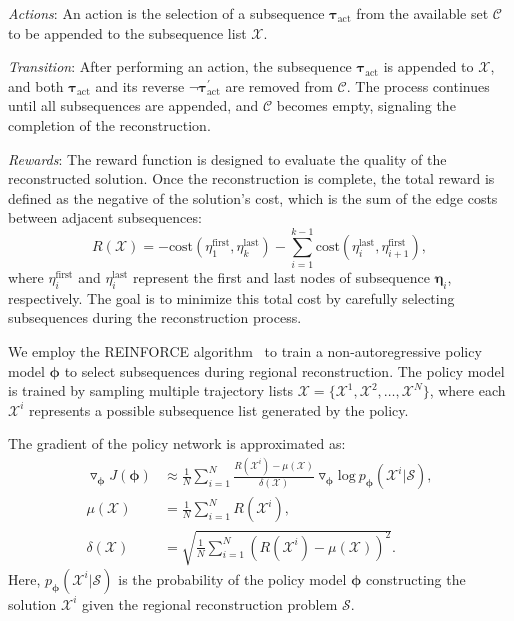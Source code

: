\textit{Actions}: An action is the selection of a subsequence $\boldsymbol{\tau}_{\text{act}}$ from the available set $\mathcal{C}$ to be appended to the subsequence list $\mathcal{X}$.

\textit{Transition}: After performing an action, the subsequence $\boldsymbol{\tau}_{\text{act}}$ is appended to $\mathcal{X}$, and both $\boldsymbol{\tau}_{\text{act}}$ and its reverse $\neg\boldsymbol{\tau}_{\text{act}}^{\prime}$ are removed from $\mathcal{C}$.
The process continues until all subsequences are appended, and  $\mathcal{C}$ becomes empty, signaling the completion of the reconstruction. 

\textit{Rewards}: The reward function is designed to evaluate the quality of the reconstructed solution. 
Once the reconstruction is complete, the total reward is defined as  the negative of the solution's cost, which is the sum of the edge costs between adjacent subsequences: 
\begin{equation}
{R(\mathcal{X})=-\text{cost}(\eta_{1}^{\text{first}}, \eta_{k}^{\text{last}})-\sum\limits_{i=1}^{k-1}\text{cost}(\eta_{i}^{\text{last}}, \eta_{i+1}^{\text{first}})},
\label{eq:Reward}
\end{equation}
where $\eta_{i}^{\text{first}}$ and $\eta_{i}^{\text{last}}$ represent the first and last nodes of subsequence $\boldsymbol{\eta}_i$, respectively. 
The goal is to minimize this total cost by carefully selecting subsequences during the reconstruction process. 

We employ the REINFORCE algorithm~\cite{williams1992simple} to train a non-autoregressive policy model $\boldsymbol{\phi}$ to select subsequences during regional reconstruction.  
The policy model is trained by sampling multiple trajectory lists $\boldsymbol{\mathcal{X}}=\{\mathcal{X}^{1}, \mathcal{X}^{2}, \dots, \mathcal{X}^{N} \}$, where each $\mathcal{X}^i$ represents a possible subsequence list generated by the policy. 

The gradient of the policy network is approximated as: 
\begin{equation}
\begin{aligned}
\triangledown_{\boldsymbol{\phi}}J(\boldsymbol{\phi}) &\approx \frac{1}{N}\sum\limits_{i=1}^{N} \frac{R(\mathcal{X}^{i}) - \mu(\boldsymbol{\mathcal{X}})}{\delta(\boldsymbol{\mathcal{X}})} \triangledown_{\boldsymbol{\phi}} \text{log} ~ p_{\boldsymbol{\phi}}(\mathcal{X}^{i}| \mathcal{S}),
\\
\mu(\boldsymbol{\mathcal{X}}) &= \frac{1}{N}\sum\limits_{i=1}^{N} R(\mathcal{X}^{i}), \\
\delta(\boldsymbol{\mathcal{X}}) &= \sqrt{\frac{1}{N}\sum\limits_{i=1}^{N} \left(R(\mathcal{X}^{i})-\mu(\boldsymbol{\mathcal{X}})\right)^2} . 
\label{eq:Regional Reconstruction Gradient}
\end{aligned}
\end{equation}
Here, $p_{\boldsymbol{\phi}}(\mathcal{X}^{i}| \mathcal{S})$ is the probability of the policy model $\boldsymbol{\phi}$ constructing the solution $\mathcal{X}^{i}$ given the regional reconstruction problem $\mathcal{S}$. 

